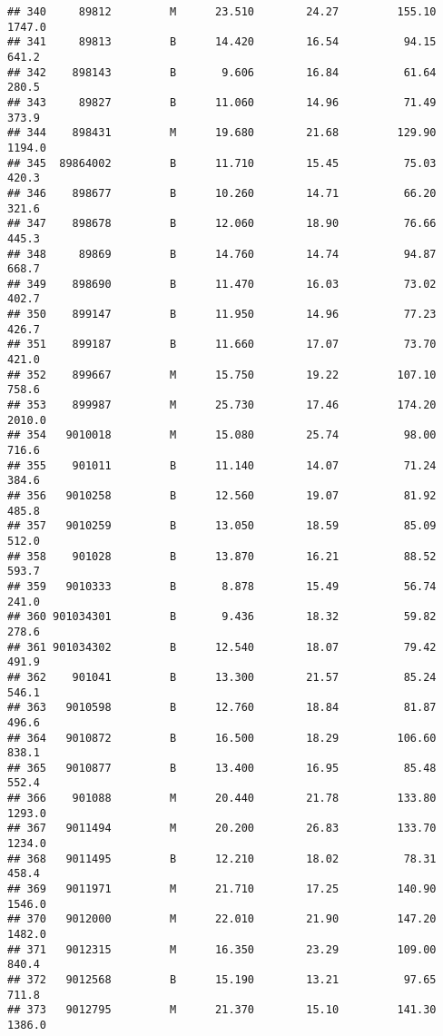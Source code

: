 \documentclass[
]{article}
\begin{document}
\begin{verbatim}
## 340     89812         M      23.510        24.27         155.10    1747.0
## 341     89813         B      14.420        16.54          94.15     641.2
## 342    898143         B       9.606        16.84          61.64     280.5
## 343     89827         B      11.060        14.96          71.49     373.9
## 344    898431         M      19.680        21.68         129.90    1194.0
## 345  89864002         B      11.710        15.45          75.03     420.3
## 346    898677         B      10.260        14.71          66.20     321.6
## 347    898678         B      12.060        18.90          76.66     445.3
## 348     89869         B      14.760        14.74          94.87     668.7
## 349    898690         B      11.470        16.03          73.02     402.7
## 350    899147         B      11.950        14.96          77.23     426.7
## 351    899187         B      11.660        17.07          73.70     421.0
## 352    899667         M      15.750        19.22         107.10     758.6
## 353    899987         M      25.730        17.46         174.20    2010.0
## 354   9010018         M      15.080        25.74          98.00     716.6
## 355    901011         B      11.140        14.07          71.24     384.6
## 356   9010258         B      12.560        19.07          81.92     485.8
## 357   9010259         B      13.050        18.59          85.09     512.0
## 358    901028         B      13.870        16.21          88.52     593.7
## 359   9010333         B       8.878        15.49          56.74     241.0
## 360 901034301         B       9.436        18.32          59.82     278.6
## 361 901034302         B      12.540        18.07          79.42     491.9
## 362    901041         B      13.300        21.57          85.24     546.1
## 363   9010598         B      12.760        18.84          81.87     496.6
## 364   9010872         B      16.500        18.29         106.60     838.1
## 365   9010877         B      13.400        16.95          85.48     552.4
## 366    901088         M      20.440        21.78         133.80    1293.0
## 367   9011494         M      20.200        26.83         133.70    1234.0
## 368   9011495         B      12.210        18.02          78.31     458.4
## 369   9011971         M      21.710        17.25         140.90    1546.0
## 370   9012000         M      22.010        21.90         147.20    1482.0
## 371   9012315         M      16.350        23.29         109.00     840.4
## 372   9012568         B      15.190        13.21          97.65     711.8
## 373   9012795         M      21.370        15.10         141.30    1386.0

\end{verbatim}
\end{document}
